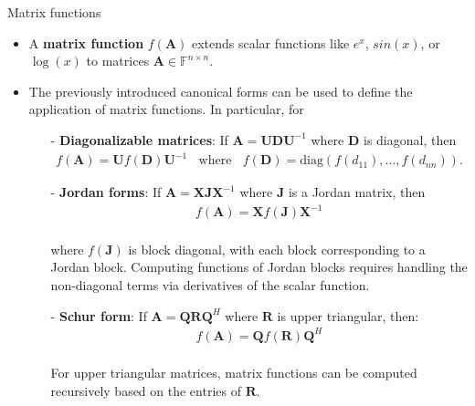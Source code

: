 \documentclass[t,usepdftitle=false]{beamer}
\begin{document}
\begin{frame}{Matrix functions}
\begin{itemize}
\item A \textbf{matrix function} $f(\mathbf{A})$ extends scalar functions like $e^x$, $sin(x)$, or $\log(x)$ to matrices $\mathbf{A}\in\mathbb{F}^{n\times n}$.
\item The previously introduced canonical forms can be used to define the application of matrix functions.
In particular, for\vspace{.1cm}
\begin{itemize}
\item[-] \textbf{Diagonalizable matrices}: If $\mathbf{A}=\mathbf{U}\mathbf{D}\mathbf{U}^{-1}$ where $\mathbf{D}$ is diagonal, then\vspace{-.1cm}
\begin{align*}
f(\mathbf{A})=\mathbf{U}f(\mathbf{D})\mathbf{U}^{-1}
\;\;\text{ where }\;\;
f(\mathbf{D})=\mathrm{diag}(f(d_{11}),\dots,f(d_{nn})).
\end{align*}
\item[-] \textbf{Jordan forms}: If $\mathbf{A}=\mathbf{X}\mathbf{J}\mathbf{X}^{-1}$ where $\mathbf{J}$ is a Jordan matrix, then\vspace{-.1cm}
\begin{align*}
f(\mathbf{A})=\mathbf{X}f(\mathbf{J})\mathbf{X}^{-1}
\end{align*}
\vspace{-.6cm}\\
where $f(\mathbf{J})$ is block diagonal, with each block corresponding to a Jordan block. 
Computing functions of Jordan blocks requires handling the non-diagonal terms via derivatives of the scalar function.\vspace{.1cm}
\item[-] \textbf{Schur form}: If $\mathbf{A}=\mathbf{Q}\mathbf{R}\mathbf{Q}^H$ where $\mathbf{R}$ is upper triangular, then:\vspace{-.1cm}
\begin{align*}
f(\mathbf{A}) = \mathbf{Q} f(\mathbf{R}) \mathbf{Q}^H
\end{align*}
\vspace{-.6cm}\\
For upper triangular matrices, matrix functions can be computed recursively based on the entries of $\mathbf{R}$.
\end{itemize}
\end{itemize}
\end{frame}
\end{document}
